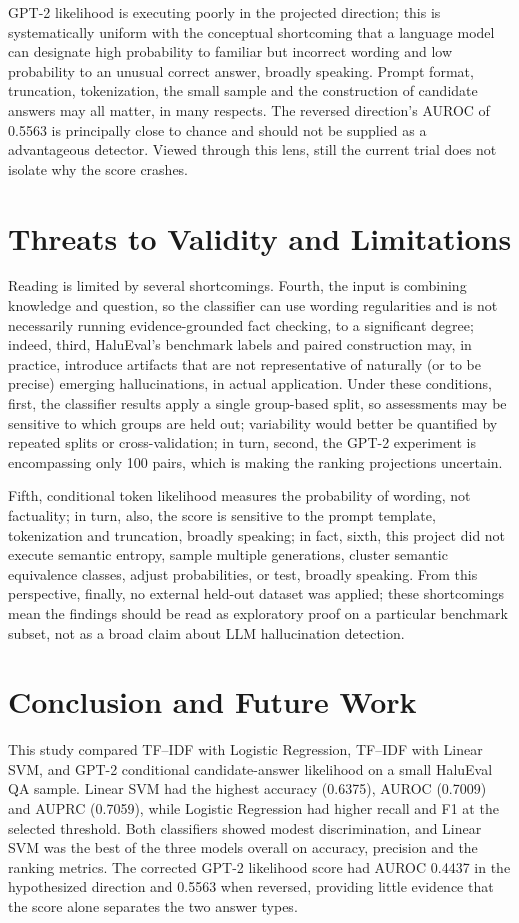 \documentclass[acmsmall,nonacm]{acmart}
\begin{document}
GPT-2 likelihood is executing poorly in the projected direction; this is systematically uniform with the conceptual shortcoming that a language model can designate high probability to familiar but incorrect wording and low probability to an unusual correct answer, broadly speaking. Prompt format, truncation, tokenization, the small sample and the construction of candidate answers may all matter, in many respects. The reversed direction's AUROC of 0.5563 is principally close to chance and should not be supplied as a advantageous detector. Viewed through this lens, still the current trial does not isolate why the score crashes.

\section{Threats to Validity and Limitations}
Reading is limited by several shortcomings. Fourth, the input is combining knowledge and question, so the classifier can use wording regularities and is not necessarily running evidence-grounded fact checking, to a significant degree; indeed, third, HaluEval's benchmark labels and paired construction may, in practice, introduce artifacts that are not representative of naturally (or to be precise) emerging hallucinations, in actual application. Under these conditions, first, the classifier results apply a single group-based split, so assessments may be sensitive to which groups are held out; variability would better be quantified by repeated splits or cross-validation; in turn, second, the GPT-2 experiment is encompassing only 100 pairs, which is making the ranking projections uncertain.

Fifth, conditional token likelihood measures the probability of wording, not factuality; in turn, also, the score is sensitive to the prompt template, tokenization and truncation, broadly speaking; in fact, sixth, this project did not execute semantic entropy, sample multiple generations, cluster semantic equivalence classes, adjust probabilities, or test, broadly speaking. From this perspective, finally, no external held-out dataset was applied; these shortcomings mean the findings should be read as exploratory proof on a particular benchmark subset, not as a broad claim about LLM hallucination detection.

\section{Conclusion and Future Work}
This study compared TF--IDF with Logistic Regression, TF--IDF with Linear SVM, and GPT-2 conditional candidate-answer likelihood on a small HaluEval QA sample. Linear SVM had the highest accuracy (0.6375), AUROC (0.7009) and AUPRC (0.7059), while Logistic Regression had higher recall and F1 at the selected threshold. Both classifiers showed modest discrimination, and Linear SVM was the best of the three models overall on accuracy, precision and the ranking metrics. The corrected GPT-2 likelihood score had AUROC 0.4437 in the hypothesized direction and 0.5563 when reversed, providing little evidence that the score alone separates the two answer types.
\end{document}
